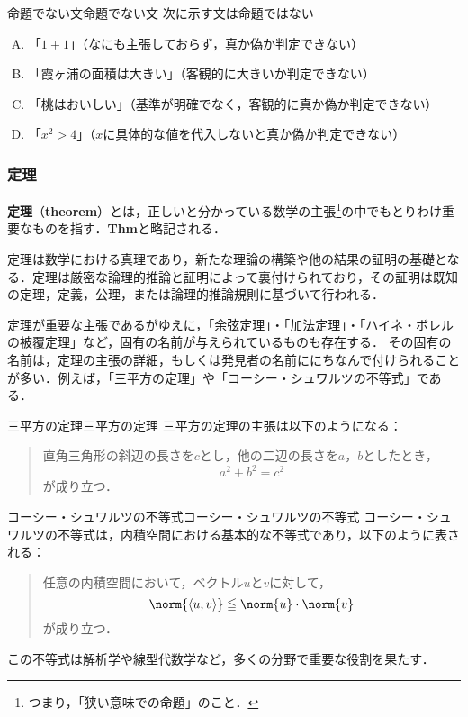 \documentclass[a4paper,11pt]{ltjsarticle}
\renewcommand{\emph}[1]{\textbf{#1}}
\renewcommand{\leq}{\leqq}
\begin{document}
\begin{example}{命題でない文}{命題でない文}
  次に示す文は命題ではない
  \begin{enumerate}[(A)]
    \item 「$1+1$」（なにも主張しておらず，真か偽か判定できない）
    \item 「霞ヶ浦の面積は大きい」（客観的に大きいか判定できない）
    \item 「桃はおいしい」（基準が明確でなく，客観的に真か偽か判定できない）
    \item 「$x^2 > 4$」（$x$に具体的な値を代入しないと真か偽か判定できない）\label{enu:命題でない文4}
  \end{enumerate}
\end{example}

\subsubsection{定理}

\emph{定理}（\emph{theorem}）とは，正しいと分かっている数学の主張\footnote{つまり，「狭い意味での命題」のこと．}の中でもとりわけ重要なものを指す．\textbf{Thm}と略記される．


定理は数学における真理であり，新たな理論の構築や他の結果の証明の基礎となる．定理は厳密な論理的推論と証明によって裏付けられており，その証明は既知の定理，定義，公理，または論理的推論規則に基づいて行われる．

定理が重要な主張であるがゆえに，「余弦定理」・「加法定理」・「ハイネ・ボレルの被覆定理」など，固有の名前が与えられているものも存在する．
その固有の名前は，定理の主張の詳細，もしくは発見者の名前ににちなんで付けられることが多い．例えば，「三平方の定理」や「コーシー・シュワルツの不等式」である．

\begin{example}{三平方の定理}{三平方の定理}
  三平方の定理の主張は以下のようになる：
  \begin{quotation}
    直角三角形の斜辺の長さを$c$とし，他の二辺の長さを$a$，$b$としたとき，
    \[
      a^2+b^2=c^2
    \]
    が成り立つ．
  \end{quotation}
\end{example}

\begin{example}{コーシー・シュワルツの不等式}{コーシー・シュワルツの不等式}
  コーシー・シュワルツの不等式は，内積空間における基本的な不等式であり，以下のように表される：
  \begin{quotation}
    任意の内積空間において，ベクトル$u$と$v$に対して，
    \[
      \norm{\langle u, v \rangle} \leq \norm{u} \cdot \norm{v}
    \]
    が成り立つ．
  \end{quotation}
  この不等式は解析学や線型代数学など，多くの分野で重要な役割を果たす．
\end{example}
\end{document}
